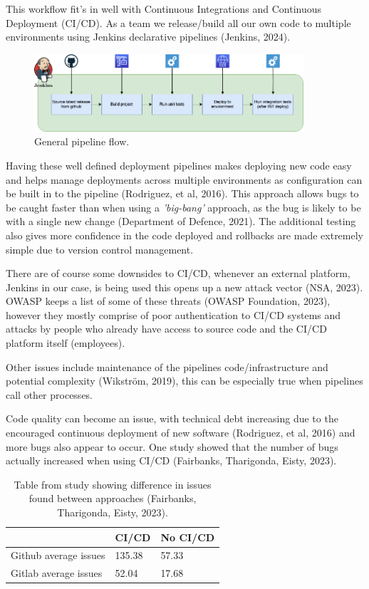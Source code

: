   This workflow fit's in well with Continuous Integrations and Continuous Deployment (CI/CD). As a team we release/build all our own code to 
  multiple environments using Jenkins declarative pipelines (Jenkins, 2024).

  \begin{figure}[H]
    \centering
    \includegraphics[width=10cm]{assets/pipeline.drawio.png}
    \caption{General pipeline flow.}
    \label{fig:pipeline}
  \end{figure}

  Having these well defined deployment pipelines makes deploying new code easy and helps manage deployments across multiple environments as configuration 
  can be built in to the pipeline (Rodriguez, et al, 2016). This approach allows bugs to be caught faster than when using 
  a \textit{'big-bang'} approach, as the bug is likely to be with a single new change (Department of Defence, 2021).
  The additional testing also gives more confidence in the code deployed and rollbacks are made extremely simple due to version control management.

  \vspace{0.2cm}

  There are of course some downsides to CI/CD, whenever an external platform, Jenkins in our case, is being used this opens up a new attack vector (NSA, 2023).
  OWASP keeps a list of some of these threats (OWASP Foundation, 2023), however they mostly comprise of poor 
  authentication to CI/CD systems and attacks by people who already have access to source code and the CI/CD platform itself (employees).

  Other issues include maintenance of the pipelines code/infrastructure and potential complexity (Wikström, 2019),
  this can be especially true when pipelines call other processes. 

  Code quality can become an issue, with technical debt increasing due to the encouraged continuous deployment of new software (Rodriguez, et al, 2016) 
  and more bugs also appear to occur. One study showed that the number of bugs actually increased when using CI/CD (Fairbanks, Tharigonda, Eisty, 2023).

  \begin{table}[H]
    \centering
    \begin{tabular}{|p{}|p{}|p{}|}
      \hline
      & CI/CD & No CI/CD \\ \hline
      Github average issues & 135.38 & 57.33 \\ \hline
      Gitlab average issues & 52.04 & 17.68 \\ \hline
    \end{tabular}
    \caption{Table from study showing difference in issues found between approaches (Fairbanks, Tharigonda, Eisty, 2023).}
  \end{table}
  
